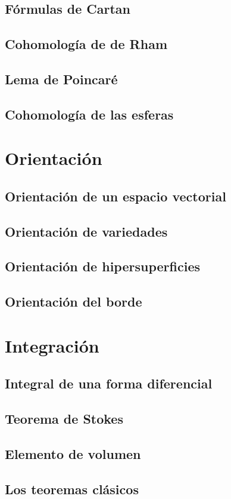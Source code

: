 \documentclass[12pt,a4paper]{book}
\theoremstyle{definition} \newtheorem{defn}[thm]{Definición}
\theoremstyle{definition} \newtheorem{ejemplo}[thm]{Ejemplo}
\theoremstyle{definition} \newtheorem{ejercicio}[thm]{Ejercicio}
\theoremstyle{remark} \newtheorem*{obs}{Observación}
\begin{document}
	  \section{Fórmulas de Cartan}
	  \section{Cohomología de de Rham}
	  \section{Lema de Poincaré}
	  \section{Cohomología de las esferas}
	  \chapter{Orientación}
	  \section{Orientación de un espacio vectorial}
	  \section{Orientación de variedades}
	  \section{Orientación de hipersuperficies}
	  \section{Orientación del borde}
	  \chapter{Integración}
	  \section{Integral de una forma diferencial}
	  \section{Teorema de Stokes}
	  \section{Elemento de volumen}
	  \section{Los teoremas clásicos}
\end{document}
